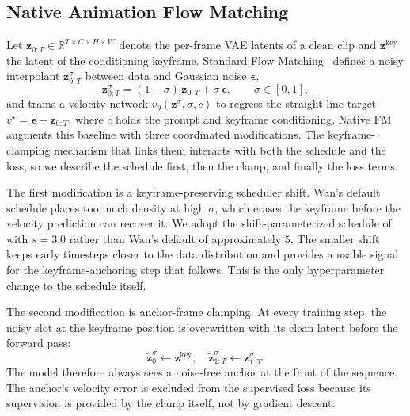\documentclass[10pt,twocolumn]{article}
\begin{document}
\subsection{Native Animation Flow Matching}\label{sec:method-fm}

Let $\mathbf{z}_{0:T} \in \mathbb{R}^{T \times C \times H \times W}$ denote the per-frame VAE latents of a clean clip and $\mathbf{z}^{\text{key}}$ the latent of the conditioning keyframe. Standard Flow Matching~\cite{lipman2023flow,liu2023rectified} defines a noisy interpolant $\mathbf{z}_{0:T}^{\sigma}$ between data and Gaussian noise $\boldsymbol{\epsilon}$,
\begin{equation}
\mathbf{z}_{0:T}^{\sigma} = (1-\sigma)\,\mathbf{z}_{0:T} + \sigma\,\boldsymbol{\epsilon},\qquad \sigma\in[0,1],
\end{equation}
and trains a velocity network $v_\theta(\mathbf{z}^{\sigma},\sigma,c)$ to regress the straight-line target $v^\star = \boldsymbol{\epsilon}-\mathbf{z}_{0:T}$, where $c$ holds the prompt and keyframe conditioning. Native FM augments this baseline with three coordinated modifications. The keyframe-clamping mechanism that links them interacts with both the schedule and the loss, so we describe the schedule first, then the clamp, and finally the loss terms.

The first modification is a keyframe-preserving scheduler shift. Wan's default schedule places too much density at high $\sigma$, which erases the keyframe before the velocity prediction can recover it. We adopt the shift-parameterized schedule of~\cite{esser2024scaling} with $s=3.0$ rather than Wan's default of approximately $5$. The smaller shift keeps early timesteps closer to the data distribution and provides a usable signal for the keyframe-anchoring step that follows. This is the only hyperparameter change to the schedule itself.

The second modification is anchor-frame clamping. At every training step, the noisy slot at the keyframe position is overwritten with its clean latent before the forward pass:
\begin{equation}
\widetilde{\mathbf{z}}^{\sigma}_{0} \leftarrow \mathbf{z}^{\text{key}},\quad \widetilde{\mathbf{z}}^{\sigma}_{1:T} \leftarrow \mathbf{z}^{\sigma}_{1:T}.
\end{equation}
The model therefore always sees a noise-free anchor at the front of the sequence. The anchor's velocity error is excluded from the supervised loss because its supervision is provided by the clamp itself, not by gradient descent.
\end{document}
